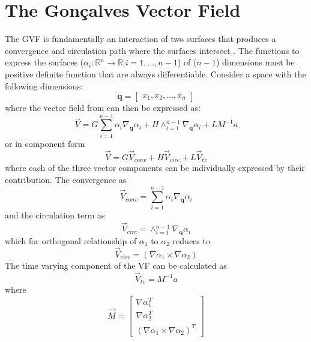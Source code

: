 \documentclass[conf]{new-aiaa}
\begin{document}
\section{The Gon\c{c}alves Vector Field}
The GVF is fundamentally an interaction of two surfaces that produces a convergence and circulation path where the surfaces intersect {\cite{goncalves_circulation_2010,goncalves_artificial_2009,goncalves_vector_2010,goncalves_coordination_2013}}. The functions to express the surfaces ($\alpha_i:\mathbb{R}^n\rightarrow\mathbb{R} | i=1,...,n-1$) of ($n-1$) dimensions must be positive definite function that are always differentiable. Consider a space with the following dimensions:
\begin{equation}
\mathbf{q} = \begin{bmatrix} x_1, x_2, ..., x_{n}\end{bmatrix}
\end{equation}
where the vector field from \cite{goncalves_circulation_2010} can then be expressed as:
\begin{equation}
\overrightarrow{V} = G  \sum_{i=1}^{n-1} \alpha_i \nabla_\mathbf{q} \alpha_i + H \wedge_{i=1}^{n-1} \nabla_\mathbf{q} \alpha_i + L M^{-1}a
\end{equation}
or in component form
\begin{equation}\label{eq:vfcomponent}
\overrightarrow{V} = G \overrightarrow{V}_{conv} + H \overrightarrow{V}_{circ} + L \overrightarrow{V}_{tv}
\end{equation}
where each of the three vector components can be individually expressed by their contribution. The convergence as
\begin{equation}
\overrightarrow{V}_{conv} =  \sum_{i=1}^{n-1} \alpha_i \nabla_\mathbf{q} \alpha_i
\end{equation}
and the circulation term as
\begin{equation}
\overrightarrow{V}_{circ} =  \wedge_{i=1}^{n-1} \nabla_\mathbf{q} \alpha_i
\end{equation}
which for orthogonal relationship of $\alpha_1$ to $\alpha_2$ reduces to 
\begin{equation}
\overrightarrow{V}_{circ} =  \left(\nabla \alpha_1 \times \nabla \alpha_2\right)
\end{equation}
The time varying component of the VF can be calculated as
\begin{equation} \label{eq:vtv}
\overrightarrow{V}_{tv} = M^{-1}a
\end{equation}
where
\begin{equation}
\overrightarrow{M} = \begin{bmatrix} \nabla \alpha_1^T \\ \nabla \alpha_2^T \\ (\nabla \alpha_1 \times \nabla \alpha_2)^T \end{bmatrix}
\end{equation}
\end{document}
